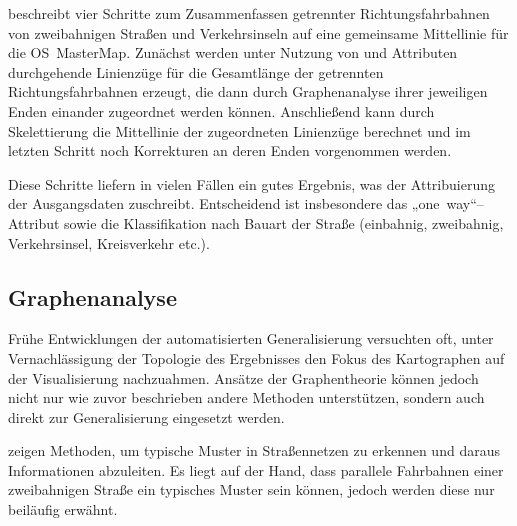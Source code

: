 \documentclass[../main/thesis.tex]{subfiles}
\begin{document}
\label{os-mastermap}

 beschreibt vier Schritte zum Zusammenfassen getrennter Richtungsfahrbahnen von zweibahnigen Straßen und Verkehrsinseln auf eine gemeinsame Mittellinie für die OS~MasterMap.
Zunächst werden unter Nutzung von  und Attributen durchgehende Linienzüge für die Gesamtlänge der getrennten Richtungsfahrbahnen erzeugt, die dann durch Graphenanalyse ihrer jeweiligen Enden einander zugeordnet werden können.
Anschließend kann durch Skelettierung die Mittellinie der zugeordneten Linienzüge berechnet und im letzten Schritt noch Korrekturen an deren Enden vorgenommen werden. 

Diese Schritte liefern in vielen Fällen ein gutes Ergebnis, was \citeauthor{Tho05} der Attribuierung der Ausgangsdaten zuschreibt.
Entscheidend ist insbesondere das „one~way“–Attribut sowie die Klassifikation nach Bauart der Straße (einbahnig, zweibahnig, Verkehrsinsel, Kreisverkehr etc.). 


\subsection{Graphenanalyse}
\label{ch:graph-based}



Frühe Entwicklungen der automatisierten Generalisierung versuchten oft, unter Vernachlässigung der Topologie des Ergebnisses den Fokus des Kartographen auf der Visualisierung nachzuahmen. 
Ansätze der Graphentheorie können jedoch nicht nur wie zuvor beschrieben andere Methoden unterstützen, sondern auch direkt zur Generalisierung eingesetzt werden.


 zeigen Methoden, um typische Muster in Straßennetzen zu erkennen und daraus Informationen abzuleiten. 
Es liegt auf der Hand, dass parallele Fahrbahnen einer zweibahnigen Straße ein typisches Muster sein können, jedoch werden diese nur beiläufig erwähnt. 
\end{document}
